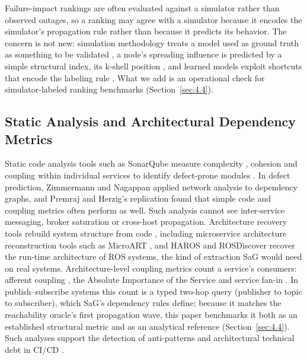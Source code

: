 Failure-impact rankings are often evaluated against a simulator rather than observed outages, so a ranking may agree with a simulator because it encodes the simulator's propagation rule rather than because it predicts its behavior. The concern is not new: simulation methodology treats a model used as ground truth as something to be validated \cite{sargent2013verification}, a node's spreading influence is predicted by a simple structural index, its k-shell position \cite{kitsak2010influential}, and learned models exploit shortcuts that encode the labeling rule \cite{geirhos2020shortcut,kapoor2023leakage}. What we add is an operational check for simulator-labeled ranking benchmarks (Section~\ref{sec:4.4}).

\subsection{Static Analysis and Architectural Dependency Metrics}
\label{sec:2.2}

Static code analysis tools such as SonarQube \cite{sonarsource2024clean} measure complexity \cite{mccabe1976complexity}, cohesion and coupling \cite{chidamber1994metrics} within individual services to identify defect-prone modules \cite{nagappan2005static,zimmermann2007predicting}. In defect prediction, Zimmermann and Nagappan \cite{zimmermann2008predicting} applied network analysis to dependency graphs, and Premraj and Herzig's replication \cite{premraj2011network} found that simple code and coupling metrics often perform as well. Such analysis cannot see inter-service messaging, broker saturation or cross-host propagation. Architecture recovery tools rebuild system structure from code \cite{bushong2021static}, including microservice architecture reconstruction tools such as MicroART \cite{granchelli2017microart}, and HAROS \cite{santos2019haros} and ROSDiscover \cite{timperley2022rosdiscover} recover the run-time architecture of ROS systems, the kind of extraction SaG would need on real systems. Architecture-level coupling metrics count a service's consumers: afferent coupling \cite{martin2003agile}, the Absolute Importance of the Service \cite{rud2006ais} and service fan-in \cite{bogner2017maintainability}. In publish--subscribe systems this count is a typed two-hop query (publisher to topic to subscriber), which SaG's dependency rules define; because it matches the reachability oracle's first propagation wave, this paper benchmarks it both as an established structural metric and as an analytical reference (Section~\ref{sec:4.4}). Such analyses support the detection of anti-patterns \cite{garcia2009catalogue,taibi2018microservice} and architectural technical debt \cite{li2015technicaldebt} in CI/CD \cite{humble2010continuous}.

